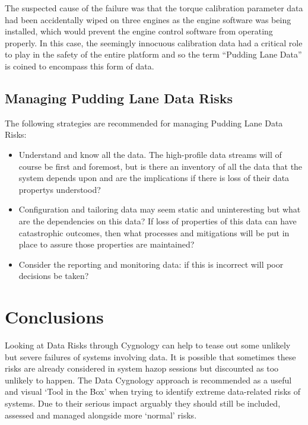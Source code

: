 The suspected cause of the failure was that the torque calibration parameter data had been
accidentally wiped on three engines as the engine software was being installed,
which would prevent the engine control software from operating properly.
In this case, the seemingly innocuous calibration data had a critical role to play in the
safety of the entire platform and so the term “Pudding Lane Data” is coined to encompass
this form of data.

\subsection{Managing Pudding Lane Data Risks}
The following strategies are recommended for managing Pudding Lane Data Risks:
\begin{itemize}
\item Understand and know all the data.
The high-profile data streams will of course be first and foremost, but is there an inventory of
all the data that the system depends upon and are the implications if there is loss of their \glspl{data property} understood? 
\item Configuration and tailoring data may seem static and uninteresting but what are the
dependencies on this data?
If loss of properties of this data can have catastrophic outcomes,
then what processes and mitigations will be put in place to assure those properties are maintained?
\item Consider the reporting and monitoring data: if this is incorrect will poor decisions be taken?
\end{itemize}

\section{Conclusions}
Looking at Data Risks through Cygnology can help to tease out some unlikely but severe failures of systems involving data. It is possible that sometimes these risks are already considered in system \gls{hazop} sessions but discounted as too unlikely to happen. The Data Cygnology approach is recommended as a useful and visual ‘Tool in the Box’ when trying to identify extreme data-related risks of systems.
Due to their serious impact arguably they should still be included, assessed and managed alongside more ‘normal’ risks.

